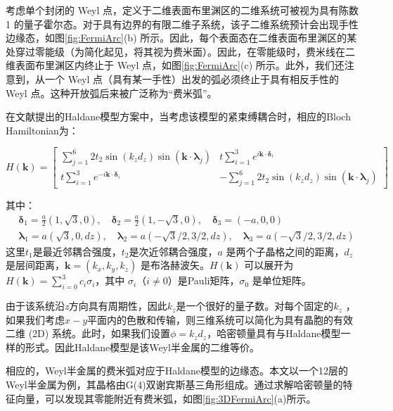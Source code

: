 考虑单个封闭的 Weyl 点，定义于二维表面布里渊区的二维系统可被视为具有陈数 1 的量子霍尔态。对于具有边界的有限二维子系统，该子二维系统预计会出现手性边缘态，如图\ref{fig:FermiArc}(b) 所示。因此，每个表面态在二维表面布里渊区的某处穿过零能级（为简化起见，将其视为费米面）。因此，在零能级时，费米线在二维表面布里渊区内终止于 Weyl 点，如图\ref{fig:FermiArc}(c) 所示。此外，我们还注意到，从一个 Weyl 点（具有某一手性）出发的弧必须终止于具有相反手性的 Weyl 点。这种开放弧后来被广泛称为“费米弧”。

在文献提出的Haldane模型方案中，当考虑该模型的紧束缚耦合时，相应的Bloch Hamiltonian为：

\begin{equation}
H(\mathbf{k}) =
\begin{bmatrix}
\sum_{j=1}^{6} 2 t_2 \sin (k_zd_z) \sin (\mathbf{k} \cdot \bm{\lambda}_j) & 
t \sum_{i=1}^{3} e^{i \mathbf{k} \cdot \bm{\delta}_i} \\
t \sum_{i=1}^{3} e^{-i \mathbf{k} \cdot \bm{\delta}_i} &
-\sum_{j=1}^{6} 2 t_2 \sin (k_zd_z) \sin (\mathbf{k} \cdot \bm{\lambda}_j)
\end{bmatrix}
\end{equation}

其中：
\begin{align}
& \bm{\delta}_1 = \frac{a}{2} (1, \sqrt{3}, 0), \quad
\bm{\delta}_2 = \frac{a}{2} (1, -\sqrt{3}, 0), \quad
\bm{\delta}_3 = (-a,0, 0) \\
& \bm{\lambda}_1 = a(\sqrt{3}, 0, dz), \quad
\bm{\lambda}_2 = a(-\sqrt{3}/2, 3/2, dz), \quad
\bm{\lambda}_3 = a(-\sqrt{3}/2, 3/2, dz)
\end{align}
这里$t_1$是最近邻耦合强度，$t_2$是次近邻耦合强度，$a$ 是两个子晶格之间的距离，$d_z$ 是层间距离，$\mathbf{k} = (k_x, k_y, k_z)$ 是布洛赫波矢。$H(\mathbf{k})$ 可以展开为 $H(\mathbf{k}) = \sum_{i=0}^3 c_i \sigma_i$，其中 $\sigma_i$（$i \neq 0$）是Pauli矩阵，$\sigma_0$ 是单位矩阵。

由于该系统沿\textit{z}方向具有周期性，因此$k_z$是一个很好的量子数。对每个固定的$k_z$ ，如果我们考虑$x-y$平面内的色散和传输，则三维系统可以简化为具有晶胞的有效二维 (2D) 系统。此时，如果我们设置$\phi=k_zd_z$，哈密顿量具有与Haldane模型一样的形式。因此Haldane模型是该Weyl半金属的二维等价。

相应的，Weyl半金属的费米弧对应于Haldane模型的边缘态。本文以一个12层的Weyl半金属为例，其晶格由G(4)双谢宾斯基三角形组成。通过求解哈密顿量的特征向量，可以发现其零能附近有费米弧，如图\ref{fig:3DFermiArc}(a)所示。

